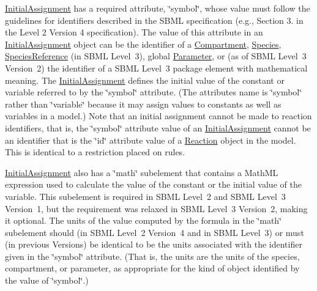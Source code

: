 \hyperlink{class_initial_assignment}{Initial\+Assignment} has a required attribute, \char`\"{}symbol\char`\"{}, whose value must follow the guidelines for identifiers described in the S\+B\+ML specification (e.\+g., Section 3. in the Level 2 Version 4 specification). The value of this attribute in an \hyperlink{class_initial_assignment}{Initial\+Assignment} object can be the identifier of a \hyperlink{class_compartment}{Compartment}, \hyperlink{class_species}{Species}, \hyperlink{class_species_reference}{Species\+Reference} (in S\+B\+ML Level~3), global \hyperlink{class_parameter}{Parameter}, or (as of S\+B\+ML Level~3 Version~2) the identifier of a S\+B\+ML Level~3 package element with mathematical meaning. The \hyperlink{class_initial_assignment}{Initial\+Assignment} defines the initial value of the constant or variable referred to by the \char`\"{}symbol\char`\"{} attribute. (The attribute\textquotesingle{}s name is \char`\"{}symbol\char`\"{} rather than \char`\"{}variable\char`\"{} because it may assign values to constants as well as variables in a model.) Note that an initial assignment cannot be made to reaction identifiers, that is, the \char`\"{}symbol\char`\"{} attribute value of an \hyperlink{class_initial_assignment}{Initial\+Assignment} cannot be an identifier that is the \char`\"{}id\char`\"{} attribute value of a \hyperlink{class_reaction}{Reaction} object in the model. This is identical to a restriction placed on rules.

\hyperlink{class_initial_assignment}{Initial\+Assignment} also has a \char`\"{}math\char`\"{} subelement that contains a Math\+ML expression used to calculate the value of the constant or the initial value of the variable. This subelement is required in S\+B\+ML Level~2 and S\+B\+ML Level~3 Version~1, but the requirement was relaxed in S\+B\+ML Level~3 Version~2, making it optional. The units of the value computed by the formula in the \char`\"{}math\char`\"{} subelement should (in S\+B\+ML Level~2 Version~4 and in S\+B\+ML Level~3) or must (in previous Versions) be identical to be the units associated with the identifier given in the \char`\"{}symbol\char`\"{} attribute. (That is, the units are the units of the species, compartment, or parameter, as appropriate for the kind of object identified by the value of \char`\"{}symbol\char`\"{}.)

